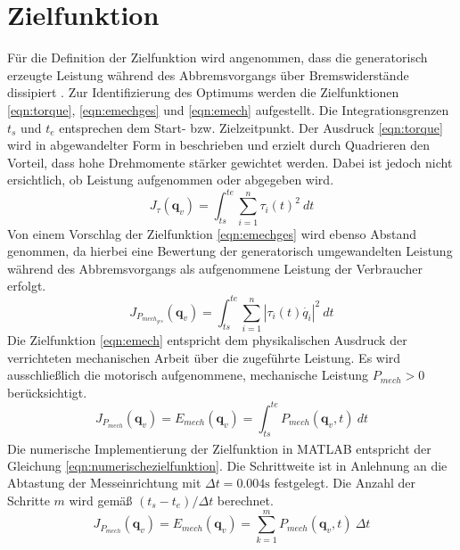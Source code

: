 \section{Zielfunktion}
Für die Definition der Zielfunktion wird angenommen, dass die generatorisch erzeugte Leistung während des Abbremsvorgangs über Bremswiderstände dissipiert \cite[S.~1327]{Pellicciari.2015}. Zur Identifizierung des Optimums werden die Zielfunktionen \ref{eqn:torque}, \ref{eqn:emechges} \cite[S.~1216]{Saravanan.2008} und \ref{eqn:emech} \cite[S.~57]{Eggers.2019} aufgestellt. Die Integrationsgrenzen $t_s$ und $t_e$ entsprechen dem Start- bzw. Zielzeitpunkt. Der Ausdruck \ref{eqn:torque} wird in abgewandelter Form in \cite[S-~1]{Hansen.2012} beschrieben und erzielt durch Quadrieren den Vorteil, dass hohe Drehmomente stärker gewichtet werden. Dabei ist jedoch nicht ersichtlich, ob Leistung aufgenommen oder abgegeben wird.
%
\begin{equation}
	\label{eqn:torque}
	J_{\tau}(\bm{q}_{v}) = \int_{ts}^{te}\sum_{i=1}^{n}\tau_i(t)^2~dt
\end{equation}
%
Von einem Vorschlag der Zielfunktion \ref{eqn:emechges} wird ebenso Abstand genommen, da hierbei eine Bewertung der generatorisch umgewandelten Leistung während des Abbremsvorgangs als aufgenommene Leistung der Verbraucher erfolgt. 
%
\begin{equation}
	\label{eqn:emechges}
	J_{P_{mech_{ges}}}(\bm{q}_{v}) = \int_{ts}^{te}\sum_{i=1}^{n}\left|\tau_i(t)\dot{q_i}\right|^2~dt
\end{equation}
%
Die Zielfunktion \ref{eqn:emech} entspricht dem physikalischen Ausdruck der verrichteten mechanischen Arbeit über die zugeführte Leistung. Es wird ausschließlich die motorisch aufgenommene, mechanische Leistung $P_{mech}>0$ berücksichtigt. 
%
\begin{equation}
	\label{eqn:emech}
	J_{P_{mech}}
	(\bm{q}_{v}) 
	= E_{mech}(\bm{q}_{v}) 
	=\int_{ts}^{te}P_{mech}(\bm{q}_{v},t)~dt
\end{equation}
%
Die numerische Implementierung der Zielfunktion in  MATLAB\textsuperscript{\textregistered} entspricht der Gleichung  \ref{eqn:numerischezielfunktion}. Die Schrittweite ist in Anlehnung an die Abtastung der Messeinrichtung  mit $\Delta t = 0.004 \text{s}$ festgelegt. Die Anzahl der Schritte $m$  wird gemäß $(t_s-t_e)/\Delta t$ berechnet.
%
\begin{equation}
	\label{eqn:numerischezielfunktion}
	J_{P_{mech}}
	(\bm{q}_{v}) 
	= E_{mech}(\bm{q}_{v}) 
	= \sum_{k=1}^{m} P_{mech}(\bm{q}_{v},t)~\Delta t
\end{equation}
%
